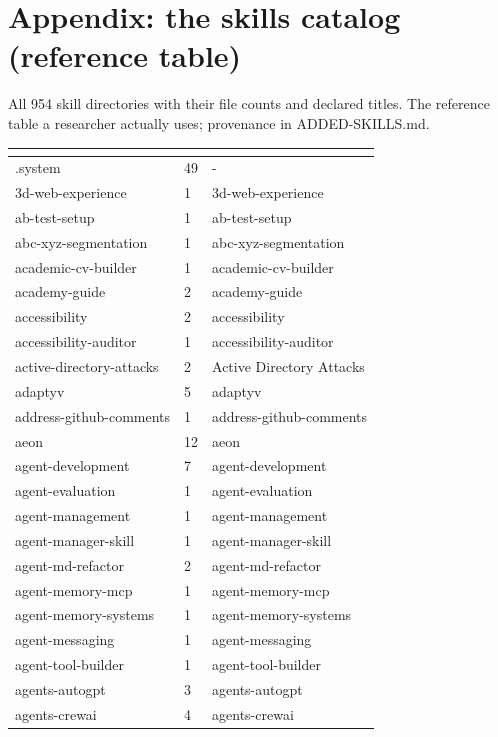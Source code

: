 \chapter{Appendix: the skills catalog (reference table)}

All 954 skill directories with their file counts and declared titles. The reference
table a researcher actually uses; provenance in ADDED-SKILLS.md.

\begin{longtable}{@{}lll@{}}
\toprule
\rowcolor{fusionblue!22} \textbf{\color{fusiondark}{Skill directory}} & \textbf{\color{fusiondark}{Files}} & \textbf{\color{fusiondark}{Declared title}}\\
\midrule
\endhead
.system & 49 & -\\
3d-web-experience & 1 & 3d-web-experience\\
ab-test-setup & 1 & ab-test-setup\\
abc-xyz-segmentation & 1 & abc-xyz-segmentation\\
academic-cv-builder & 1 & academic-cv-builder\\
academy-guide & 2 & academy-guide\\
accessibility & 2 & accessibility\\
accessibility-auditor & 1 & accessibility-auditor\\
active-directory-attacks & 2 & Active Directory Attacks\\
adaptyv & 5 & adaptyv\\
address-github-comments & 1 & address-github-comments\\
aeon & 12 & aeon\\
agent-development & 7 & agent-development\\
agent-evaluation & 1 & agent-evaluation\\
agent-management & 1 & agent-management\\
agent-manager-skill & 1 & agent-manager-skill\\
agent-md-refactor & 2 & agent-md-refactor\\
agent-memory-mcp & 1 & agent-memory-mcp\\
agent-memory-systems & 1 & agent-memory-systems\\
agent-messaging & 1 & agent-messaging\\
agent-tool-builder & 1 & agent-tool-builder\\
agents-autogpt & 3 & agents-autogpt\\
agents-crewai & 4 & agents-crewai\\

\end{longtable}
